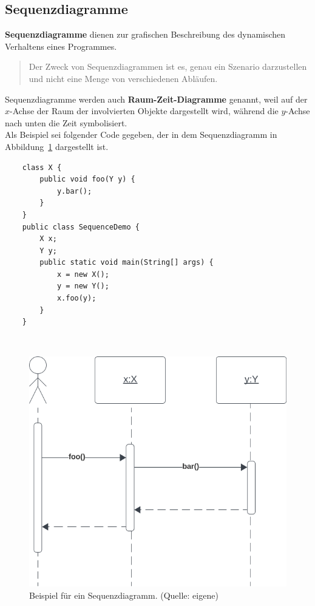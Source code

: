 \subsection{Sequenzdiagramme}

\textbf{Sequenzdiagramme} dienen zur grafischen Beschreibung des dynamischen Verhaltens eines Programmes.\\

\begin{tcolorbox}
\blockquote[{\cite[333]{Oes05}}]{
Der Zweck von Sequenzdiagrammen ist es, genau ein Szenario darzustellen und nicht eine Menge von verschiedenen Abläufen.
}
\end{tcolorbox}

\noindent
Sequenzdiagramme werden auch \textbf{Raum-Zeit-Diagramme} genannt, weil auf der $x$-Achse der Raum der involvierten
Objekte dargestellt wird, während die $y$-Achse nach unten die Zeit symbolisiert.\\

\noindent
Als Beispiel sei folgender Code gegeben, der in dem Sequenzdiagramm in Abbildung~\ref{fig:sequence} dargestellt ist.

\begin{verbatim}
    class X {
        public void foo(Y y) {
            y.bar();
        }
    }
    public class SequenceDemo {
        X x;
        Y y;
        public static void main(String[] args) {
            x = new X();
            y = new Y();
            x.foo(y);
        }
    }
\end{verbatim}\\


\begin{figure}
    \centering
    \includegraphics[scale=0.5]{chapters/fopt3/img/sequence}
    \caption{Beispiel für ein Sequenzdiagramm. (Quelle: eigene)}
    \label{fig:sequence}
\end{figure}

